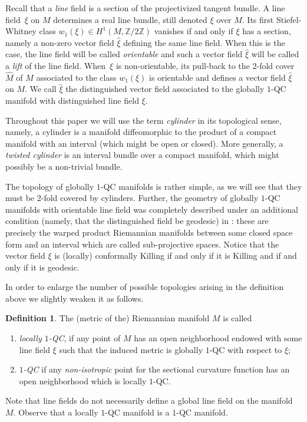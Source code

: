 \documentclass[10pt]{amsart}
\theoremstyle{definition}
\newtheorem{definition}[theorem]{Definition}
\theoremstyle{remark}
\numberwithin{equation}{section}
\newcommand{\ZZ}{\mathbb Z}
\begin{document}
Recall that a \emph{line} field is a section of the projectivized tangent bundle.
A line field~$\xi$ on $M$ determines a real line bundle, still denoted $\xi$
over $M$. Its first Stiefel-Whitney class $w_1(\xi)\in H^1(M,\ZZ/2\ZZ)$ vanishes
if and only if $\xi$ has a section, namely a non-zero vector field $\widehat{\xi}$
defining the same line field. When this is the case, the line field will be called \emph{orientable} and such a vector field
$\widehat{\xi}$ will be called a \emph{lift} of the line field.
When~$\xi$ is non-orientable, its pull-back to the 2-fold cover $\widehat{M}$ of $M$ associated to
the class $w_1(\xi)$ is orientable and defines a vector field $\widehat{\xi}$ on $M$.
We call $\widehat{\xi}$ the distinguished vector field associated to the globally $1$-QC manifold
with distinguished line field $\xi$.

Throughout this paper we will use the term \emph{cylinder} in its topological sense,
namely, a cylinder is a manifold diffeomorphic to the product of a compact manifold with an interval (which might be open or closed).
More generally, a \emph{twisted cylinder} is an interval bundle over a compact manifold, which might possibly be a non-trivial bundle.

The topology of globally $1$-QC manifolds is rather
simple, as we will see that they must be 2-fold covered by cylinders.
Further, the geometry of globally $1$-QC manifolds with orientable line field was completely described
under an additional condition (namely, that the distinguished field
be geodesic) in \cite[\S6]{GM}:
these are precisely the warped product Riemannian manifolds
between some closed space form and an interval which are called
sub-projective spaces. Notice that the vector field $\xi$ is (locally) conformally Killing if and only if it is Killing and if and only if it is geodesic.

In order to enlarge the number of possible topologies arising in the definition above we slightly weaken it as follows.

\begin{definition}
The (metric of the) Riemannian manifold $M$ is called
\begin{enumerate}
\item \emph{locally $1$-QC},
if any point of $M$ has an open neighborhood endowed with some line field $\xi$ such that
the induced metric is globally $1$-QC with respect to $\xi$;
\item \emph{$1$-QC} if any \emph{non-isotropic} point for the sectional curvature
function has an open neighborhood which is locally $1$-QC.
\end{enumerate}
\end{definition}
Note that line fields do not necessarily define a global line field on the manifold~$M$.
Observe that a locally $1$-QC manifold is a $1$-QC manifold.
\end{document}

